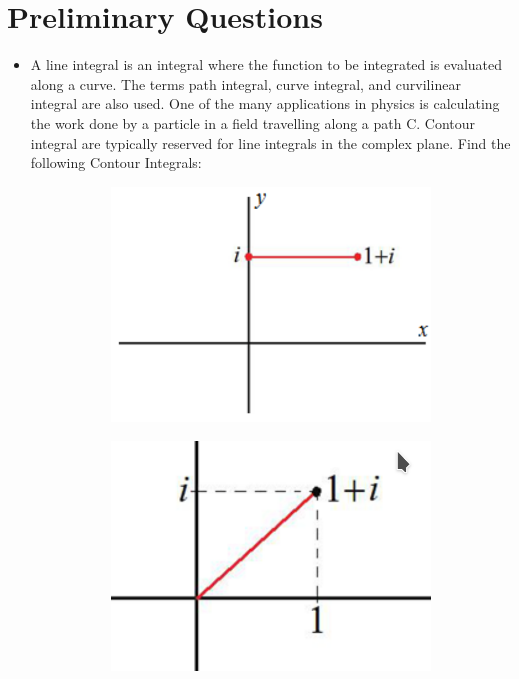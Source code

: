 \documentclass{article}
\begin{document}
\section{Preliminary Questions}
 \begin{itemize}
  \item A line integral is an integral where the function to be integrated is evaluated along a curve. The terms path integral, curve integral, and curvilinear integral are also used. One of the many applications in physics is calculating the work done by a particle in a field travelling along a path C. Contour integral are typically reserved for line integrals in the complex plane. Find the following Contour Integrals:
\begin{figure}[h]
\centering
\begin{subfigure}{\textwidth}
  \centering
  \includegraphics[width=.3\linewidth]{P1}
\end{subfigure}%
\begin{subfigure}{\textwidth}
  \centering
  \includegraphics[width=.3\linewidth]{P2}
\end{subfigure}
\end{figure}


\end{itemize}
\end{document}

